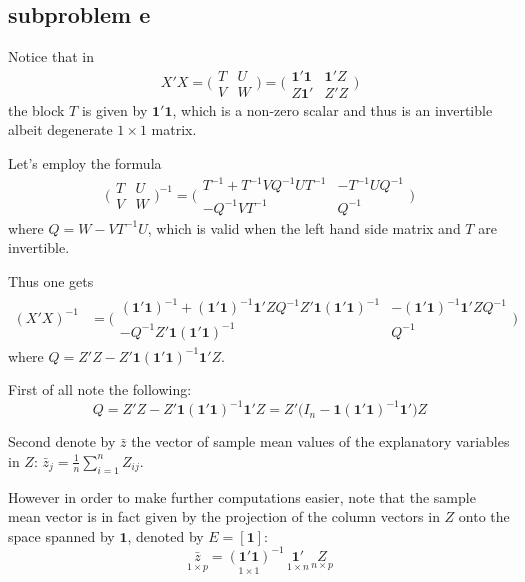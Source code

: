 \documentclass[a4paper]{article}
\newcommand{\clo}[1]{{\left [ #1 \right ]}}
\newcommand{\e}{\mathbf{1}}
\begin{document}

\subsection{subproblem e} %
\label{sub:subproblem_e}

Notice that in 
\[ X'X = \bigg(\begin{matrix} T & U \\ V & W \end{matrix}\bigg) = \bigg(\begin{matrix} \e'\e & \e'Z \\ Z\e' & Z'Z \end{matrix}\bigg) \]
the block $T$ is given by $\e'\e$, which is a non-zero scalar and thus is an
invertible albeit degenerate $1\times 1$ matrix.

Let's employ the formula 
\[\bigg(\begin{matrix} T & U \\ V & W \end{matrix}\bigg)^{-1} = \bigg(\begin{matrix} T^{-1} + T^{-1} V Q^{-1} U T^{-1} & - T^{-1} U Q^{-1} \\ -Q^{-1} V T^{-1} & Q^{-1} \end{matrix}\bigg) \]
where $Q = W - VT^{-1}U$, which is valid when the left hand side matrix and
$T$ are invertible.

Thus one gets
\begin{align*}
	(X'X)^{-1}
	&= \bigg(\begin{matrix} (\e'\e)^{-1} + (\e'\e)^{-1} \e'Z Q^{-1} Z'\e (\e'\e)^{-1} & - (\e'\e)^{-1} \e'Z Q^{-1} \\ -Q^{-1} Z'\e (\e'\e)^{-1} & Q^{-1} \end{matrix}\bigg)
\end{align*}
where $Q = Z'Z - Z'\e (\e'\e)^{-1}\e'Z$.

First of all note the following:
\[Q = Z'Z - Z'\e (\e'\e)^{-1}\e'Z = Z'\big( I_n - \e (\e'\e)^{-1}\e' \big)Z\]

Second denote by $\bar{z}$ the vector of sample mean values of the explanatory
variables in $Z$: $\bar{z}_j = \frac{1}{n}\sum_{i=1}^n Z_{ij}$.

However in order to make further computations easier, note that the sample
mean vector is in fact given by the projection of the column vectors in $Z$
onto the space spanned by $\e$, denoted by $E = \clo{\e}$:
\[\underset{1\times p}{\bar{z}} = \underset{1\times 1}{(\e'\e)}^{-1}\, \underset{1\times n}{\e'}\,\underset{n\times p}{Z}\]
\end{document}
